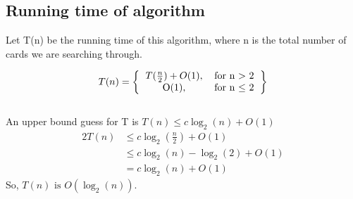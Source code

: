 \documentclass[a4paper,12pt]{article}
\begin{document}
\subsection*{Running time of algorithm}
Let T(n) be the running time of this algorithm, where n is the total
number of cards we are searching through.

\[T(n) = \left\{
\begin{tabular}{c c}
    \(T(\frac{n}{2}) + O(1)\),& for n \(>\) 2 \\
    O(1),& for n \(\le\) 2\\
\end{tabular}
\right\}\]\\

An upper bound guess for T is \(T(n) \le c\log_2 (n) + O(1) \)
\begin{alignat*}{2}
  T(n)& \le c\log_2 (\frac{n}{2}) + O(1) \\
  {}& \le c\log_2 (n) - \log_2 (2) + O(1)\\
  {}& = c\log_2(n) + O(1)
\end{alignat*}
So, \(T(n) \text{ is } O(\log_2 (n))\).
\end{document}
